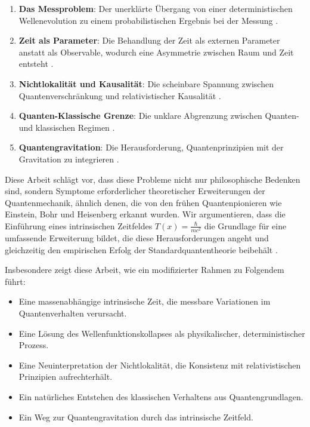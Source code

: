 \documentclass[12pt,a4paper]{article}
\newcommand{\Tfield}{T(x)}
\begin{document}
	\begin{enumerate}
		\item \textbf{Das Messproblem}: Der unerklärte Übergang von einer deterministischen Wellenevolution zu einem probabilistischen Ergebnis bei der Messung \cite{vonNeumann1932, Wheeler1983}.
		
		\item \textbf{Zeit als Parameter}: Die Behandlung der Zeit als externen Parameter anstatt als Observable, wodurch eine Asymmetrie zwischen Raum und Zeit entsteht \cite{Pauli1980, Peres1980}.
		
		\item \textbf{Nichtlokalität und Kausalität}: Die scheinbare Spannung zwischen Quantenverschränkung und relativistischer Kausalität \cite{Bell1964, EPR1935, Aspect1982}.
		
		\item \textbf{Quanten-Klassische Grenze}: Die unklare Abgrenzung zwischen Quanten- und klassischen Regimen \cite{Joos1985, Zurek2003, Leggett2002}.
		
		\item \textbf{Quantengravitation}: Die Herausforderung, Quantenprinzipien mit der Gravitation zu integrieren \cite{Rovelli2004, Kiefer2007, Oriti2009}.
	\end{enumerate}
	
	Diese Arbeit schlägt vor, dass diese Probleme nicht nur philosophische Bedenken sind, sondern Symptome erforderlicher theoretischer Erweiterungen der Quantenmechanik, ähnlich denen, die von den frühen Quantenpionieren wie Einstein, Bohr und Heisenberg erkannt wurden. Wir argumentieren, dass die Einführung eines intrinsischen Zeitfeldes $\Tfield = \frac{\hbar}{mc^2}$ die Grundlage für eine umfassende Erweiterung bildet, die diese Herausforderungen angeht und gleichzeitig den empirischen Erfolg der Standardquantentheorie beibehält \cite{pascher_zeit_2025}.
	
	Insbesondere zeigt diese Arbeit, wie ein modifizierter Rahmen zu Folgendem führt:
	\begin{itemize}
		\item Eine massenabhängige intrinsische Zeit, die messbare Variationen im Quantenverhalten verursacht.
		\item Eine Lösung des Wellenfunktionskollapses als physikalischer, deterministischer Prozess.
		\item Eine Neuinterpretation der Nichtlokalität, die Konsistenz mit relativistischen Prinzipien aufrechterhält.
		\item Ein natürliches Entstehen des klassischen Verhaltens aus Quantengrundlagen.
		\item Ein Weg zur Quantengravitation durch das intrinsische Zeitfeld.
	\end{itemize}
	
\end{document}
